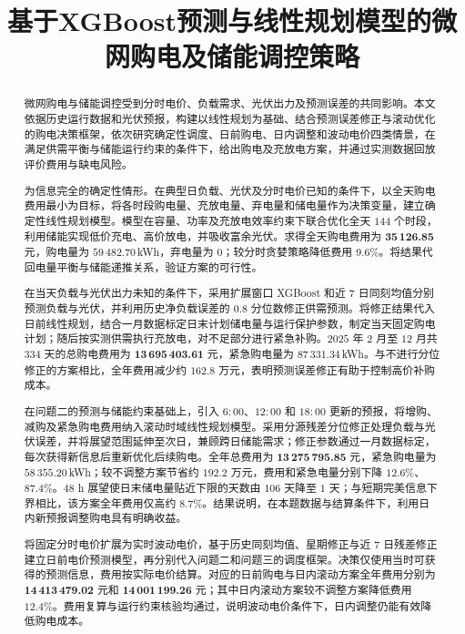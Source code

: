 \title{基于XGBoost预测与线性规划模型的微网购电及储能调控策略}
\maketitle


\begin{abstract}
微网购电与储能调控受到分时电价、负载需求、光伏出力及预测误差的共同影响。本文依据历史运行数据和光伏预报，构建以线性规划为基础、结合预测误差修正与滚动优化的购电决策框架，依次研究确定性调度、日前购电、日内调整和波动电价四类情景，在满足供需平衡与储能运行约束的条件下，给出购电及充放电方案，并通过实测数据回放评价费用与缺电风险。

为信息完全的确定性情形。在典型日负载、光伏及分时电价已知的条件下，以全天购电费用最小为目标，将各时段购电量、充放电量、弃电量和储电量作为决策变量，建立确定性线性规划模型。模型在容量、功率及充放电效率约束下联合优化全天 $144$ 个时段，利用储能实现低价充电、高价放电，并吸收富余光伏。求得全天购电费用为 \textbf{35\,126.85} 元，购电量为 $59\,482.70$\,kWh，弃电量为 $0$；较分时贪婪策略降低费用 $9.6\%$。将结果代回电量平衡与储能递推关系，验证方案的可行性。

在当天负载与光伏出力未知的条件下，采用扩展窗口 XGBoost 和近 $7$ 日同刻均值分别预测负载与光伏，并利用历史净负载误差的 $0.8$ 分位数修正供需预测。将修正结果代入日前线性规划，结合一月数据标定日末计划储电量与运行保护参数，制定当天固定购电计划；随后按实测供需执行充放电，对不足部分进行紧急补购。$2025$ 年 $2$ 月至 $12$ 月共 $334$ 天的总购电费用为 \textbf{13\,695\,403.61} 元，紧急购电量为 $87\,331.34$\,kWh。与不进行分位修正的方案相比，全年费用减少约 $162.8$ 万元，表明预测误差修正有助于控制高价补购成本。

在问题二的预测与储能约束基础上，引入 $6{:}00$、$12{:}00$ 和 $18{:}00$ 更新的预报，将增购、减购及紧急购电费用纳入滚动时域线性规划模型。采用分源残差分位修正处理负载与光伏误差，并将展望范围延伸至次日，兼顾跨日储能需求；修正参数通过一月数据标定，每次获得新信息后重新优化后续购电。全年总费用为 \textbf{13\,275\,795.85} 元，紧急购电量为 $58\,355.20$\,kWh；较不调整方案节省约 $192.2$ 万元，费用和紧急电量分别下降 $12.6\%$、$87.4\%$。$48$ h 展望使日末储电量贴近下限的天数由 $106$ 天降至 $1$ 天；与短期完美信息下界相比，该方案全年费用仅高约 $8.7\%$。结果说明，在本题数据与结算条件下，利用日内新预报调整购电具有明确收益。

将固定分时电价扩展为实时波动电价，基于历史同刻均值、星期修正与近 $7$ 日残差修正建立日前电价预测模型，再分别代入问题二和问题三的调度框架。决策仅使用当时可获得的预测信息，费用按实际电价结算。对应的日前购电与日内滚动方案全年费用分别为 \textbf{14\,413\,479.02} 元和 \textbf{14\,001\,199.26} 元；其中日内滚动方案较不调整方案降低费用 $12.4\%$。费用复算与运行约束核验均通过，说明波动电价条件下，日内调整仍能有效降低购电成本。

\end{abstract}

